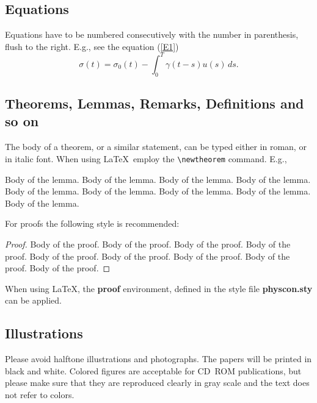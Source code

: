 \documentclass{physcon}
\begin{document}
\subsection{Equations}
Equations have to be numbered consecutively with the number
in parenthesis, flush to the right. E.g., see 
the equation (\ref{E1})
\begin{equation}                        \label{E1}                 
\sigma(t)=\sigma_0(t)-\int_0^T \gamma(t-s)u(s)\,ds.
\end{equation}

\subsection{Theorems, Lemmas, Remarks, Definitions and so on}
The body of a theorem, or a similar statement, can be typed 
either in roman, or in italic font. When using \LaTeX~employ the 
\verb|\newtheorem| command. E.g.,
\begin{lemma}
Body of the lemma. Body of the lemma. Body of the lemma.
Body of the lemma. Body of the lemma. Body of the lemma.
Body of the lemma. Body of the lemma. Body of the lemma.
\end{lemma}

For proofs the following style is recommended:

\begin{proof}
Body of the proof. Body of the proof. Body of the proof.
Body of the proof. Body of the proof. Body of the proof.
Body of the proof. Body of the proof. Body of the proof.
\end{proof}
When using LaTeX, the {\bf proof} environment, defined
in the style file {\bf physcon.sty} can be applied.

\subsection{Illustrations}

Please avoid halftone illustrations and photographs.
The papers will be printed in black and white. 
Colored figures are acceptable for CD~ROM
publications, but please make sure that they are reproduced 
clearly in gray scale and the text does not refer to colors.
\end{document}
